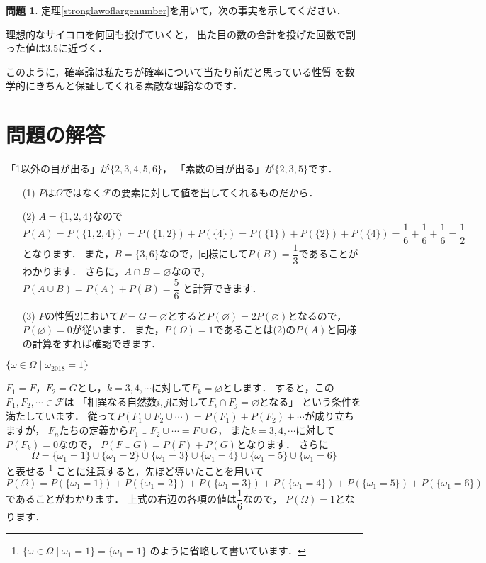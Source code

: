 \documentclass[./main]{subfiles} %
\theoremstyle{definition}
\newtheorem{hamadaqst}[hamadadefi]{問題}
\begin{document}
\begin{hamadaqst}\label{test}
定理\ref{stronglawoflargenumber}を用いて，次の事実を示してください．
\begin{center}
理想的なサイコロを何回も投げていくと，
出た目の数の合計を投げた回数で割った値は$3.5$に近づく．
\end{center}
\end{hamadaqst}

このように，確率論は私たちが確率について当たり前だと思っている性質
を数学的にきちんと保証してくれる素敵な理論なのです．

\section{問題の解答}

「1以外の目が出る」が$\{2,3,4,5,6\}$，
「素数の目が出る」が$\{2,3,5\}$です．

\begin{itemize}
\item[(1)]
$P$は$\Omega$ではなく$\mathcal{F}$の要素に対して値を出してくれるものだから．
\item[(2)]
$A=\{1,2,4\}$なので
\[ P(A)=P(\{1,2,4\})=P(\{1,2\})+P(\{4\})=P(\{1\})+P(\{2\})+P(\{4\})
=\frac{1}{6}+\frac{1}{6}+\frac{1}{6}=\frac{1}{2} \]
となります．
また，$B=\{3,6\}$なので，同様にして$P(B)=\dfrac{1}{3}$であることがわかります．
さらに，$A\cap B=\varnothing$なので，$P(A\cup B)=P(A)+P(B)=\dfrac{5}{6}$
と計算できます．
\item[(3)]
$P$の性質2において$F=G=\varnothing$とすると$P(\varnothing)=2P(\varnothing)$となるので，
$P(\varnothing)=0$が従います．
また，$P(\Omega)=1$であることは(2)の$P(A)$と同様の計算をすれば確認できます．
\end{itemize}

$\{\omega\in\Omega\mid\omega_{2018}=1\}$

$F_1=F$，$F_2=G$とし，$k=3,4,\cdots$に対して$F_k=\varnothing$とします．
すると，この$F_1,F_2,\cdots\in\mathcal{F}$は
「相異なる自然数$i,j$に対して$F_i\cap F_j=\varnothing$となる」
という条件を満たしています．
従って$P(F_1\cup F_2\cup\cdots)=P(F_1)+P(F_2)+\cdots$が成り立ちますが，
$F_n$たちの定義から$F_1\cup F_2\cup\cdots=F\cup G$，
また$k=3,4,\cdots$に対して$P(F_k)=0$なので，
$P(F\cup G)=P(F)+P(G)$となります．
さらに
\[ \Omega=\{\omega_1=1\}\cup\{\omega_1=2\}\cup
\{\omega_1=3\}\cup\{\omega_1=4\}\cup
\{\omega_1=5\}\cup\{\omega_1=6\} \]
と表せる
\footnote{$\{\omega\in\Omega\mid\omega_1=1\}=\{\omega_1=1\}$
のように省略して書いています．}
ことに注意すると，先ほど導いたことを用いて
\[ P(\Omega)=P(\{\omega_1=1\})+P(\{\omega_1=2\})+
P(\{\omega_1=3\})+P(\{\omega_1=4\})+P(\{\omega_1=5\})+
P(\{\omega_1=6\}) \]
であることがわかります．
上式の右辺の各項の値は$\dfrac{1}{6}$なので，
$P(\Omega)=1$となります．
\end{document}
